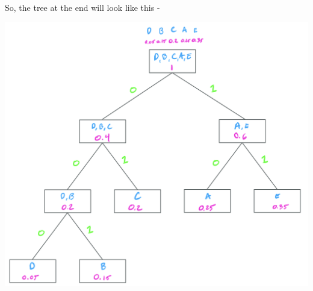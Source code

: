 \documentclass[9pt]{article}
\begin{document}
\begin{enumerate}
    So, the tree at the end will look like this -
    \begin {center}
    \includegraphics[scale=0.35]{hw6p3b.png} 
    \end{center}
    \begin{center}
    \end{center}
    
\end{enumerate}

\fi

\newpage

\end{document}
